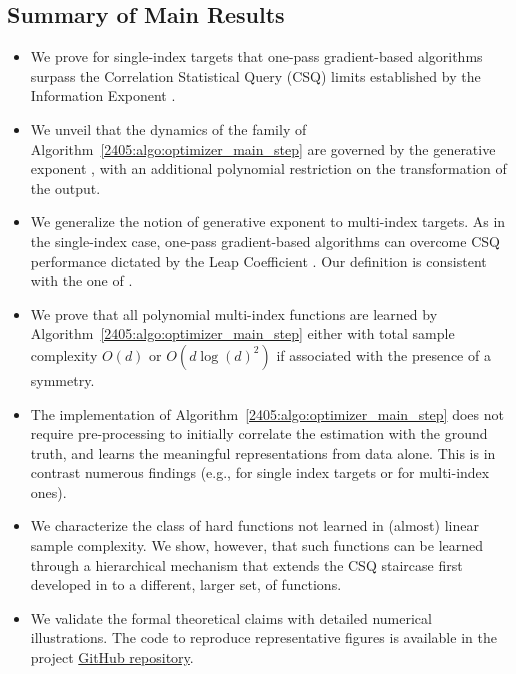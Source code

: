 \subsection*{Summary of Main Results}
\begin{itemize}
    \item We prove for single-index targets that one-pass gradient-based algorithms surpass the Correlation Statistical Query (CSQ) limits established by the Information Exponent \citep{arous2021online}.  
    \item We unveil that the dynamics of the family of Algorithm~\ref{2405:algo:optimizer_main_step} are governed by the generative exponent \cite{damian2024computational}, with an additional polynomial restriction on the transformation of the output.
    \item We generalize the notion of generative exponent to multi-index targets. As in the single-index case, one-pass gradient-based algorithms can overcome CSQ performance dictated by the Leap Coefficient \citep{abbe2022merged}. Our definition is consistent with the one of \citep{troiani2024fundamental}. 
    \item We prove that all polynomial multi-index functions are learned by Algorithm~\ref{2405:algo:optimizer_main_step} either with total sample complexity $O(d)$ or $O(d \log(d)^2)$ if associated with the presence of a symmetry. 
    \item  The implementation of Algorithm~\ref{2405:algo:optimizer_main_step} does not require pre-processing to initially correlate the estimation with the ground truth, and learns the meaningful representations from data alone. This is in contrast numerous findings (e.g., \cite{mondelli2018fundamental,luo2019optimal,maillard2020phase} for single index targets or \cite{chen2020learning} for multi-index ones).
    \item We characterize the class of hard functions not learned  in (almost) linear sample complexity. We show, however, that such functions can be learned through a hierarchical mechanism that extends the CSQ staircase first developed in \cite{abbe2021staircase} to a different, larger set, of functions.
    \item We validate the formal theoretical claims with detailed numerical illustrations. The code to reproduce representative figures is available in the project \href{https://github.com/IdePHICS/Repetita-Iuvant}{GitHub repository}.
\end{itemize}
